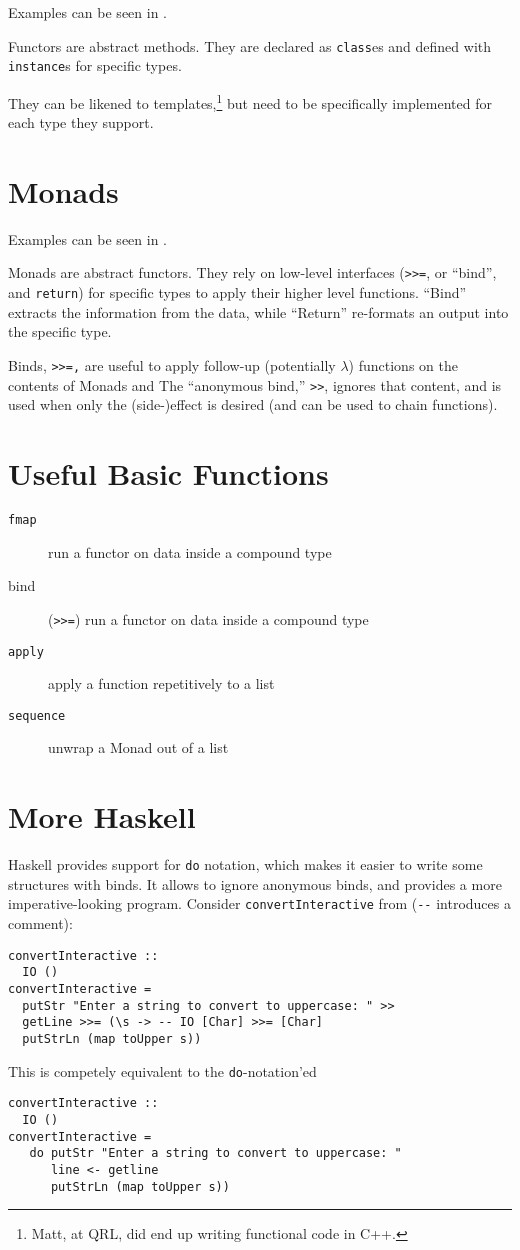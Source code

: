 \documentclass[a4paper]{article}
\begin{document}
Examples can be seen in .

Functors are abstract methods. They are declared as \verb_class_es and defined
with \verb_instance_s for specific types.

They can be likened to templates,\footnote{Matt, at QRL, did end up writing
functional code in C++.} but need to be specifically implemented for each type
they support.

\section{Monads}

Examples can be seen in .

Monads are abstract functors. They rely on low-level interfaces (\verb_>>=_, or
``bind'', and \verb_return_) for specific types to apply their higher level
functions. ``Bind'' extracts the information from the data, while ``Return''
re-formats an output into the specific type.

Binds, \verb_>>=,_ are useful to apply follow-up (potentially $\lambda$)
functions on the contents of Monads and The ``anonymous bind,'' \verb_>>_,
ignores that content, and is used when only the (side-)effect is desired (and
can be used to chain functions).

\section{Useful Basic Functions}

\begin{description}
  \item[\texttt{fmap}] run a functor on data inside a compound type
  \item[bind] (\verb_>>=_) run a functor on data inside a compound type
  \item[\texttt{apply}] apply a function repetitively to a list
  \item[\texttt{sequence}] unwrap a Monad out of a list
\end{description}

\section{More Haskell}

Haskell provides support for \verb_do_ notation, which makes it easier to write
some structures with binds. It allows to ignore anonymous binds, and provides a
more imperative-looking program. Consider \verb_convertInteractive_ from
 (\verb_--_ introduces a comment):
\begin{verbatim}
convertInteractive ::
  IO ()
convertInteractive =
  putStr "Enter a string to convert to uppercase: " >>
  getLine >>= (\s -> -- IO [Char] >>= [Char]
  putStrLn (map toUpper s))
\end{verbatim}
This is competely equivalent to the \verb_do_-notation'ed
\begin{verbatim}
convertInteractive ::
  IO ()
convertInteractive =
   do putStr "Enter a string to convert to uppercase: "
      line <- getline
      putStrLn (map toUpper s))
\end{verbatim}
\end{document}
